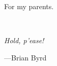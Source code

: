 
\begin{center}

For my parents.
\end{center}
\ \\
\begin{flushright}
\textit{Hold, p'ease!}

---Brian Byrd

\end{flushright}


